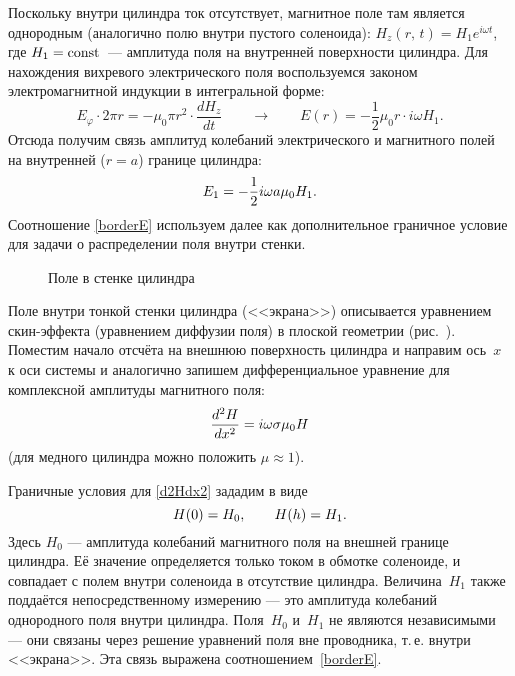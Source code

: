 Поскольку внутри цилиндра ток отсутствует, магнитное поле там является
однородным (аналогично полю внутри пустого соленоида):
$H_z(r,\,t)=H_1 e^{i\omega t}$, где $H_1=\mathrm{const}$~--- амплитуда поля на внутренней
поверхности цилиндра. Для нахождения вихревого электрического поля
воспользуемся законом электромагнитной индукции  в интегральной
форме:
\[
E_{\varphi}\cdot 2\pi r = -\mu_0 \pi r^2 \cdot \frac{dH_z}{dt}\qquad
\to
\qquad
E(r) = -\frac12 \mu_0 r \cdot i\omega H_1.
\]
Отсюда получим связь амплитуд колебаний электрического и магнитного полей
на внутренней ($r=a$) границе цилиндра:
\begin{equation}\eqmark{borderE}
E_1 = -\frac12  i\omega a\mu_0 H_1.
\end{equation}
Соотношение \eqref{borderE} используем далее как дополнительное граничное
условие для задачи о распределении поля внутри стенки.

\begin{wrapfigure}{o}{0.27\textwidth}
    \caption{Поле в стенке цилиндра}
\end{wrapfigure}
Поле внутри тонкой стенки цилиндра (<<экрана>>) описывается уравнением скин-эффекта
 (уравнением диффузии поля) в плоской геометрии
(рис.~).
Поместим начало отсчёта на внешнюю поверхность цилиндра и направим ось~$x$
к оси системы и аналогично 
запишем дифференциальное уравнение для комплексной амплитуды магнитного поля:
\begin{equation}\eqmark{d2Hdx2}
\frac{d^2H}{dx^2} = i\omega \sigma \mu_0 H
\end{equation}
(для медного цилиндра можно положить $\mu\approx 1$).

Граничные условия для \eqref{d2Hdx2} зададим в виде
\begin{equation}\eqmark{borderH}
H(0) = H_0,\qquad H(h) = H_1.
\end{equation}
Здесь $H_0$ --- амплитуда колебаний магнитного поля на внешней
границе цилиндра. Её значение определяется только током
в обмотке соленоиде, и совпадает с полем внутри соленоида
в отсутствие цилиндра. Величина~$H_1$ также поддаётся непосредственному
измерению --- это амплитуда колебаний однородного поля внутри цилиндра.
Поля~$H_0$ и~$H_1$ не являются независимыми --- они связаны через
решение уравнений поля вне проводника, т.\,е. внутри <<экрана>>. Эта связь
выражена соотношением~\eqref{borderE}.


